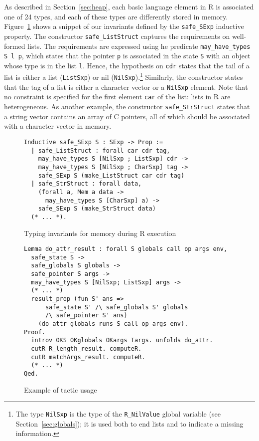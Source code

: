 \documentclass[
    sigplan,
    10pt,
    review, %
    natbib=false %
 ]{acmart}
\begin{document}
As described in Section~\ref{sec:heap},
each basic language element in R is associated one of 24 types,
and each of these types are differently stored in memory.
Figure~\ref{fig:invariants:definition} shows a snippet
of our invariants defined by the \texttt{safe_SExp} inductive property.
%
The constructor \texttt{safe_ListStruct} captures the requirements on well-formed lists. The requirements are expressed using he predicate \texttt{may_have_types S l p}, which 
states that the pointer \texttt{p}
is associated in the state \texttt{S} with an object
whose type is in the list \texttt{l}. Hence, the hypothesis on \texttt{cdr} states that the tail of a list is either a list
(\texttt{ListSxp}) or nil (\texttt{NilSxp}).\footnote{The type \texttt{NilSxp} is the type of the \texttt{R_NilValue} global variable (see Section~\ref{sec:globals}); it is used both to end lists and to indicate a missing information.}
Similarly, the constructor states that the tag
of a list is either a character vector or a \texttt{NilSxp} element.
Note that no constraint is specified for the first element \texttt{car} of the list: lists in R are heterogeneous.
%
As another example, the constructor \texttt{safe_StrStruct} states that a string vector contains an array of C pointers,
all of which should be associated with a character vector in memory.

\begin{figure}
\begin{verbatim}
Inductive safe_SExp S : SExp -> Prop :=
  | safe_ListStruct : forall car cdr tag,
    may_have_types S [NilSxp ; ListSxp] cdr ->
    may_have_types S [NilSxp ; CharSxp] tag ->
    safe_SExp S (make_ListStruct car cdr tag)
  | safe_StrStruct : forall data,
    (forall a, Mem a data ->
      may_have_types S [CharSxp] a) ->
    safe_SExp S (make_StrStruct data)
  (* ... *).
\end{verbatim}
    \caption{Typing invariants for memory during R execution}
    \label{fig:invariants:definition}
\end{figure}


\begin{figure}
\begin{verbatim}
Lemma do_attr_result : forall S globals call op args env,
  safe_state S ->
  safe_globals S globals ->
  safe_pointer S args ->
  may_have_types S [NilSxp; ListSxp] args ->
  (* ... *)
  result_prop (fun S' ans =>
      safe_state S' /\ safe_globals S' globals
      /\ safe_pointer S' ans)
    (do_attr globals runs S call op args env).
Proof.
  introv OKS OKglobals OKargs Targs. unfolds do_attr.
  cutR R_length_result. computeR.
  cutR matchArgs_result. computeR.
  (* ... *)
Qed.
\end{verbatim}
    \caption{Example of tactic usage}
    \label{fig:do_attr_result}
\end{figure}
\end{document}
